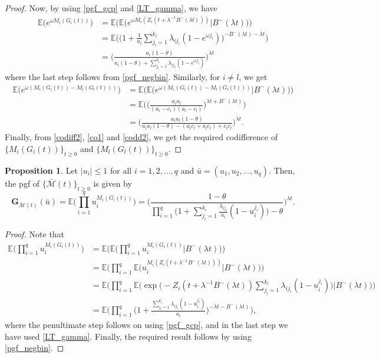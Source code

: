 \documentclass[12pt,oneside,reqno]{amsart}
\numberwithin{equation}{section}
\theoremstyle{definition}
\numberwithin{equation}{section}
\newtheorem{proposition}{Proposition}[section]
\theoremstyle{remarkstyle}
\begin{document}
\begin{proof}
Now, by using \eqref{pgf_gcp} and \eqref{LT_gamma}, we have
\begin{align}\label{co1}
\mathbb{E}\Big(e^{\omega M_i(G_i(t))}\Big)&=\mathbb{E}\Big(\mathbb{E}\Big(e^{\omega M_i(Z_i(t+\lambda^{-1}B^-(\lambda t)))}\big|B^-(\lambda t)\Big)\Big)\nonumber\\
&=\mathbb{E}\Big(\Big(1+\frac{1}{a_i}\sum_{j_i=1}^{k_i}\lambda_{ij_i}(1-e^{\omega j_i})\Big)^{-B^-(\lambda t)-\lambda t}\Big)\nonumber\\
&=\Big(\frac{a_i(1-\theta)}{a_i(1-\theta)+\sum_{j_i=1}^{k_i}\lambda_{ij_i}(1-e^{\omega j_i})}\Big)^{\lambda t}
\end{align}
where the last step follows from \eqref{pgf_negbin}.
Similarly, for $i\ne l$, we get
\begin{align*}
\mathbb{E}\Big(e^{\omega(M_i(G_i(t))-M_l(G_l(t)))}\Big)&=\mathbb{E}\Big(\mathbb{E}\Big(e^{\omega(M_i(G_i(t))-M_l(G_l(t)))}\big|B^-(\lambda t)\Big)\Big)\nonumber\\
&=\mathbb{E}\Big(\Big(\frac{a_ia_l}{(a_i-c_i)(a_l-c_l)}\Big)^{\lambda t+B^-(\lambda t)}\Big)\nonumber\\
&=\Big(\frac{a_ia_l(1-\theta)}{a_ia_l(1-\theta)-(a_ic_l+a_lc_i)+c_ic_l}\Big)^{\lambda t}.\label{codd2}
\end{align*}	
Finally, from \eqref{codiff2}, \eqref{co1} and \eqref{codd2}, we get the required codifference of $\{M_i(G_i(t))\}_{t\geq0}$ and $\{M_l(G_l(t))\}_{t\geq0}$.	
\end{proof}

\begin{proposition}
Let $|u_i|\leq 1$ for all $i=1,2,\dots,q$ and  $\bar{u}=(u_1,u_2,\dots,u_q)$. Then, the pgf of $\{\bar{\mathscr{M}}(t)\}_{t\ge 0}$ is given by
\begin{equation*}\label{pgf_MG}
\mathbf{G}_{\bar{\mathscr{M}}(t)}(\bar{u})=\mathbb{E}\Big(\prod_{i=1}^{q}u_i^{M_i(G_i(t))}\Big)=\Bigg(
\frac{1-\theta}{ \prod_{i=1}^{q}\big(1+\sum_{j_i=1}^{k_i}\frac{\lambda_{ij_i}}{a_i}(1-u_i^{j_i})\big)-\theta}\Bigg)^{\lambda t}.
\end{equation*}
\end{proposition}
\begin{proof}Note that
	\begin{align*}
		\mathbb{E}\Big(\prod_{i=1}^{q}u_i^{M_i(G_i(t))}\Big)&=\mathbb{E}\Big(\mathbb{E}\Big(\prod_{i=1}^{q}u_i^{M_i(G_i(t))}\big|B^-(\lambda t)\Big)\Big)\\
			&=\mathbb{E}\Big(\prod_{i=1}^{q}\mathbb{E}\Big(u_i^{M_i(Z_i(t+\lambda^{-1}B^-(\lambda t)))}\Big|B^-(\lambda t)\Big)\Big)\\
		&=\mathbb{E}\Big(\prod_{i=1}^{q}\mathbb{E}\Big(\exp\Big(-Z_i(t+\lambda^{-1}B^-(\lambda t))\sum_{j_i=1}^{k_i}\lambda_{ij_i}(1-u_i^{j_i})
		\Big)\Big|B^-(\lambda t)\Big)\Big)\\
		&=\mathbb{E}\Big(\prod_{i=1}^{q}\Big(1+\frac{\sum_{j_i=1}^{k_i}\lambda_{ij_i}(1-u_i^{j_i})}{a_i}\Big)^{-\lambda t-B^-(\lambda t)}\Big),
	\end{align*}
	where the penultimate step follows on using \eqref{pgf_gcp}, and in the last step we have used \eqref{LT_gamma}. Finally, the required result follows by using \eqref{pgf_negbin}.
\end{proof}
\end{document}
